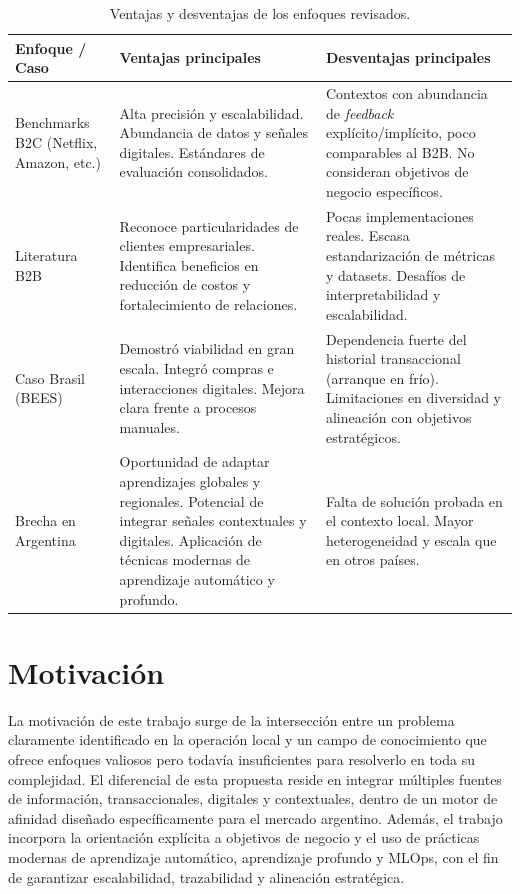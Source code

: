 \begin{table}[H]
\centering
\caption[Ventajas y desventajas de enfoques en recomendación]{Ventajas y desventajas de los enfoques revisados.}
\label{tab:estado_arte}
\begin{tabularx}{\textwidth}{>{\hsize=0.5\hsize}X >{\hsize=1.25\hsize}X >{\hsize=1.25\hsize}X}
\toprule
\textbf{Enfoque / Caso} & \textbf{Ventajas principales} & \textbf{Desventajas principales} \\
\midrule
Benchmarks B2C (Netflix, Amazon, etc.) &
Alta precisión y escalabilidad. Abundancia de datos y señales digitales. Estándares de evaluación consolidados. &
Contextos con abundancia de \textit{feedback} explícito/implícito, poco comparables al B2B. No consideran objetivos de negocio específicos. \\
Literatura B2B &
Reconoce particularidades de clientes empresariales. Identifica beneficios en reducción de costos y fortalecimiento de relaciones. &
Pocas implementaciones reales. Escasa estandarización de métricas y datasets. Desafíos de interpretabilidad y escalabilidad. \\
Caso Brasil (BEES) &
Demostró viabilidad en gran escala. Integró compras e interacciones digitales. Mejora clara frente a procesos manuales. &
Dependencia fuerte del historial transaccional (arranque en frío). Limitaciones en diversidad y alineación con objetivos estratégicos. \\
Brecha en Argentina &
Oportunidad de adaptar aprendizajes globales y regionales. Potencial de integrar señales contextuales y digitales. Aplicación de técnicas modernas de aprendizaje automático y profundo. &
Falta de solución probada en el contexto local. Mayor heterogeneidad y escala que en otros países. \\
\bottomrule
\end{tabularx}
\end{table}


\section{Motivación}

La motivación de este trabajo surge de la intersección entre un problema claramente identificado en la operación local y un campo de conocimiento que ofrece enfoques valiosos pero todavía insuficientes para resolverlo en toda su complejidad. El diferencial de esta propuesta reside en integrar múltiples fuentes de información, transaccionales, digitales y contextuales, dentro de un motor de afinidad diseñado específicamente para el mercado argentino. Además, el trabajo incorpora la orientación explícita a objetivos de negocio y el uso de prácticas modernas de aprendizaje automático, aprendizaje profundo y MLOps, con el fin de garantizar escalabilidad, trazabilidad y alineación estratégica.

